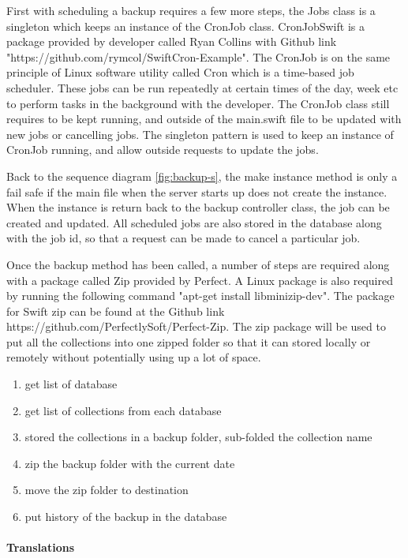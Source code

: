First with scheduling a backup requires a few more steps, the Jobs class is a singleton which keeps an instance of the CronJob class. CronJobSwift is a package provided by developer called Ryan Collins with Github link "https://github.com/rymcol/SwiftCron-Example". The CronJob is on the same principle of Linux software utility called Cron which is a time-based job scheduler. These jobs can be run repeatedly at certain times of the day, week etc to perform tasks in the background with the developer. The CronJob class still requires to be kept running, and outside of the main.swift file to be updated with new jobs or cancelling jobs. The singleton pattern is used to keep an instance of CronJob running, and allow outside requests to update the jobs. 

Back to the sequence diagram \ref{fig:backup-s}, the make instance method is only a fail safe if the main file when the server starts up does not create the instance. When the instance is return back to the backup controller class, the job can be created and updated. All scheduled jobs are also stored in the database along with the job id, so that a request can be made to cancel a particular job.

Once the backup method has been called, a number of steps are required along with a package called Zip provided by Perfect. A Linux package is also required by running the following command "apt-get install libminizip-dev". The package for Swift zip can be found at the Github link https://github.com/PerfectlySoft/Perfect-Zip. The zip package will be used to put all the collections into one zipped folder so that it can stored locally or remotely without potentially using up a lot of space.

\begin{enumerate}
  \item get list of database 
  \item get list of collections from each database
  \item stored the collections in a backup folder, sub-folded the collection name
  \item zip the backup folder with the current date
  \item move the zip folder to destination
  \item put history of the backup in the database
\end{enumerate}

\paragraph{Translations}



